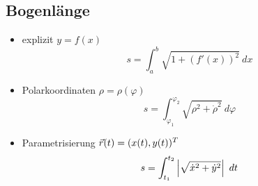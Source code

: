 \subsection{Bogenlänge}
    \begin{itemize}
        \item explizit $y = f(x)$
            $$
                s = \int_a^b \sqrt{1 + \left( f'(x) \right)^2} \ dx
            $$
        \item Polarkoordinaten $\rho = \rho(\varphi)$
            $$
                s = \int_{\varphi_1}^{\varphi_2} \sqrt{\rho^2 + \dot{\rho}^2} \ d\varphi
            $$
        \item Parametrisierung $\vec{r}(t) = (x(t),y(t))^T$
            $$
                s = \int_{t_1}^{t_2} \left\lvert \sqrt{\dot{x}^2 + \dot{y}^2} \right\rvert \ dt
            $$
    \end{itemize}